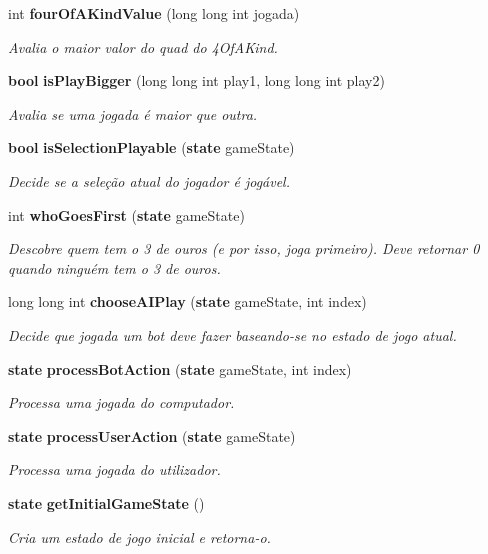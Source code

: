 \begin{DoxyCompactItemize}
int {\bf four\+Of\+A\+Kind\+Value} (long long int jogada)
\begin{DoxyCompactList}\small\item\em Avalia o maior valor do quad do 4\+Of\+A\+Kind. \end{DoxyCompactList}\item 
{\bf bool} {\bf is\+Play\+Bigger} (long long int play1, long long int play2)
\begin{DoxyCompactList}\small\item\em Avalia se uma jogada é maior que outra. \end{DoxyCompactList}\item 
{\bf bool} {\bf is\+Selection\+Playable} ({\bf state} game\+State)
\begin{DoxyCompactList}\small\item\em Decide se a seleção atual do jogador é jogável. \end{DoxyCompactList}\item 
int {\bf who\+Goes\+First} ({\bf state} game\+State)
\begin{DoxyCompactList}\small\item\em Descobre quem tem o 3 de ouros (e por isso, joga primeiro). Deve retornar 0 quando ninguém tem o 3 de ouros. \end{DoxyCompactList}\item 
long long int {\bf choose\+A\+I\+Play} ({\bf state} game\+State, int index)
\begin{DoxyCompactList}\small\item\em Decide que jogada um bot deve fazer baseando-\/se no estado de jogo atual. \end{DoxyCompactList}\item 
{\bf state} {\bf process\+Bot\+Action} ({\bf state} game\+State, int index)
\begin{DoxyCompactList}\small\item\em Processa uma jogada do computador. \end{DoxyCompactList}\item 
{\bf state} {\bf process\+User\+Action} ({\bf state} game\+State)
\begin{DoxyCompactList}\small\item\em Processa uma jogada do utilizador. \end{DoxyCompactList}\item 
{\bf state} {\bf get\+Initial\+Game\+State} ()
\begin{DoxyCompactList}\small\item\em Cria um estado de jogo inicial e retorna-\/o. \end{DoxyCompactList}\end{DoxyCompactItemize}


